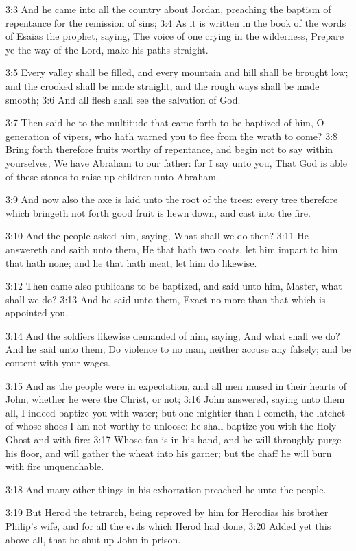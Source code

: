 3:3 And he came into all the country about Jordan, preaching the baptism of repentance for the remission of sins; 3:4 As it is written in the book of the words of Esaias the prophet, saying, The voice of one crying in the wilderness, Prepare ye the way of the Lord, make his paths straight.

3:5 Every valley shall be filled, and every mountain and hill shall be brought low; and the crooked shall be made straight, and the rough ways shall be made smooth; 3:6 And all flesh shall see the salvation of God.

3:7 Then said he to the multitude that came forth to be baptized of him, O generation of vipers, who hath warned you to flee from the wrath to come?  3:8 Bring forth therefore fruits worthy of repentance, and begin not to say within yourselves, We have Abraham to our father: for I say unto you, That God is able of these stones to raise up children unto Abraham.

3:9 And now also the axe is laid unto the root of the trees: every tree therefore which bringeth not forth good fruit is hewn down, and cast into the fire.

3:10 And the people asked him, saying, What shall we do then?  3:11 He answereth and saith unto them, He that hath two coats, let him impart to him that hath none; and he that hath meat, let him do likewise.

3:12 Then came also publicans to be baptized, and said unto him, Master, what shall we do?  3:13 And he said unto them, Exact no more than that which is appointed you.

3:14 And the soldiers likewise demanded of him, saying, And what shall we do? And he said unto them, Do violence to no man, neither accuse any falsely; and be content with your wages.

3:15 And as the people were in expectation, and all men mused in their hearts of John, whether he were the Christ, or not; 3:16 John answered, saying unto them all, I indeed baptize you with water; but one mightier than I cometh, the latchet of whose shoes I am not worthy to unloose: he shall baptize you with the Holy Ghost and with fire: 3:17 Whose fan is in his hand, and he will throughly purge his floor, and will gather the wheat into his garner; but the chaff he will burn with fire unquenchable.

3:18 And many other things in his exhortation preached he unto the people.

3:19 But Herod the tetrarch, being reproved by him for Herodias his brother Philip's wife, and for all the evils which Herod had done, 3:20 Added yet this above all, that he shut up John in prison.

